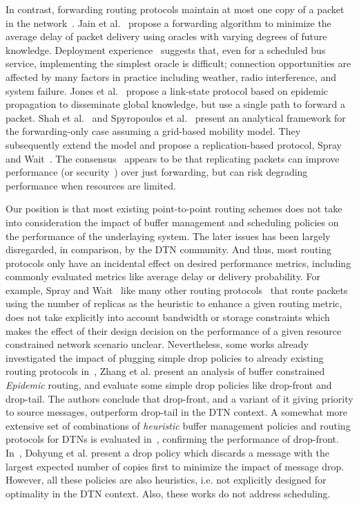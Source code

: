 In contrast, forwarding routing protocols maintain at most one copy of a packet in the network~\cite{Fall:DTNrouting,Waterloo:wdtn,akis:technical1}. Jain et
al.~\cite{Fall:DTNrouting} propose a forwarding algorithm to minimize the average delay of packet delivery using oracles with varying
degrees of future knowledge. Deployment experience~\cite{BalasubramanianLV07} suggests that, even for a scheduled bus service, implementing
the simplest oracle is difficult; connection opportunities are affected by many factors in practice including weather, radio
interference, and system failure. Jones et al.~\cite{Waterloo:wdtn} propose a link-state protocol based on
epidemic propagation to disseminate global knowledge, but use a single path to forward a packet. Shah et al.~\cite{Shah:datamules} and
Spyropoulos et al.~\cite{akis:technical1} present an analytical framework for
the forwarding-only case assuming a grid-based mobility model. They subsequently extend the model and propose a
replication-based protocol, Spray and Wait~\cite{akis:wdtn}. The consensus~\cite{akis:wdtn} appears to be that replicating packets can improve
performance (or security~\cite{Levine:Mobihoc07}) over just forwarding, but can risk degrading performance when resources are limited.

Our position is that most existing point-to-point routing schemes does not take into consideration the impact of buffer management and scheduling policies on the performance of the underlaying system. The later issues has been largely disregarded, in comparison, by the DTN community. And thus, most routing protocols only have an incidental effect on desired performance metrics, including commonly evaluated metrics like average delay or delivery probability. For example, Spray and Wait~\cite{akis:wdtn} like many other routing protocols~\cite{Haas:wdtn,Vahdat:epidemic} that route packets using the number of replicas as the heuristic to enhance a given routing metric, does not take explicitly into account bandwidth or storage constraints which makes the effect of their design decision on the performance of a given resource constrained network scenario unclear. Nevertheless, some works already investigated the impact of plugging simple drop policies to already existing routing protocols in~\cite{Towsley:Epidemic}, Zhang et al. present an analysis of buffer constrained \emph{Epidemic} routing, and evaluate some simple drop policies like drop-front and drop-tail. The authors conclude that drop-front, and a variant of it giving priority to source messages, outperform drop-tail in the DTN context. A somewhat more extensive set of combinations of \emph{heuristic} buffer management policies and routing protocols for DTNs is evaluated in~\cite{QueuingPolicies}, confirming the performance of drop-front. In~\cite{DCopies}, Dohyung et al. present a drop policy which discards a message with the largest expected number of copies first to minimize the impact of message drop. However, all these policies are also heuristics, i.e. not explicitly designed for optimality in the DTN context. Also, these works do not address scheduling. 

